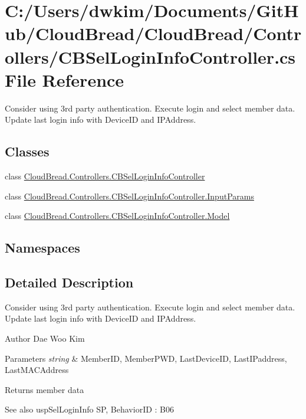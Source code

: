 \hypertarget{a00222}{}\section{C\+:/\+Users/dwkim/\+Documents/\+Git\+Hub/\+Cloud\+Bread/\+Cloud\+Bread/\+Controllers/\+C\+B\+Sel\+Login\+Info\+Controller.cs File Reference}
\label{a00222}


Consider using 3rd party authentication. Execute login and select member data. ~\newline
Update last login info with Device\+ID and I\+P\+Address.  


\subsection*{Classes}
\begin{DoxyCompactItemize}
\item 
class \hyperlink{a00051}{Cloud\+Bread.\+Controllers.\+C\+B\+Sel\+Login\+Info\+Controller}
\item 
class \hyperlink{a00093}{Cloud\+Bread.\+Controllers.\+C\+B\+Sel\+Login\+Info\+Controller.\+Input\+Params}
\item 
class \hyperlink{a00150}{Cloud\+Bread.\+Controllers.\+C\+B\+Sel\+Login\+Info\+Controller.\+Model}
\end{DoxyCompactItemize}
\subsection*{Namespaces}
\begin{DoxyCompactItemize}
\end{DoxyCompactItemize}


\subsection{Detailed Description}
Consider using 3rd party authentication. Execute login and select member data. ~\newline
Update last login info with Device\+ID and I\+P\+Address. 

\begin{DoxyAuthor}{Author}
Dae Woo Kim 
\end{DoxyAuthor}

\begin{DoxyParams}{Parameters}
{\em string} & Member\+ID, Member\+P\+WD, Last\+Device\+ID, Last\+I\+Paddress, Last\+M\+A\+C\+Address \\
\hline
\end{DoxyParams}
\begin{DoxyReturn}{Returns}
member data 
\end{DoxyReturn}
\begin{DoxySeeAlso}{See also}
usp\+Sel\+Login\+Info SP, Behavior\+ID \+: B06 
\end{DoxySeeAlso}
